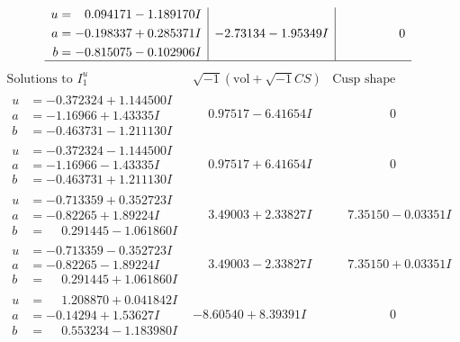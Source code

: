 \documentclass[1p]{elsarticle_modified}
\theoremstyle{definition}
\newcommand{\I}{\sqrt{-1}}
\begin{document}
$$\begin{array}{c|c|c}
\begin{aligned}
u &= \phantom{-}0.094171 - 1.189170 I \\
a &= -0.198337 + 0.285371 I \\
b &= -0.815075 - 0.102906 I\end{aligned}
 & -2.73134 - 1.95349 I & \phantom{-0.000000 } 0\\
 \hline 
 \end{array}$$\newpage$$\begin{array}{c|c|c}  
\text{Solutions to }I^u_{1}& \I (\text{vol} + \sqrt{-1}CS) & \text{Cusp shape}\\
 \hline 
\begin{aligned}
u &= -0.372324 + 1.144500 I \\
a &= -1.16966 + 1.43335 I \\
b &= -0.463731 - 1.211130 I\end{aligned}
 & \phantom{-}0.97517 - 6.41654 I & \phantom{-0.000000 } 0 \\ \hline\begin{aligned}
u &= -0.372324 - 1.144500 I \\
a &= -1.16966 - 1.43335 I \\
b &= -0.463731 + 1.211130 I\end{aligned}
 & \phantom{-}0.97517 + 6.41654 I & \phantom{-0.000000 } 0 \\ \hline\begin{aligned}
u &= -0.713359 + 0.352723 I \\
a &= -0.82265 + 1.89224 I \\
b &= \phantom{-}0.291445 - 1.061860 I\end{aligned}
 & \phantom{-}3.49003 + 2.33827 I & \phantom{-}7.35150 - 0.03351 I \\ \hline\begin{aligned}
u &= -0.713359 - 0.352723 I \\
a &= -0.82265 - 1.89224 I \\
b &= \phantom{-}0.291445 + 1.061860 I\end{aligned}
 & \phantom{-}3.49003 - 2.33827 I & \phantom{-}7.35150 + 0.03351 I \\ \hline\begin{aligned}
u &= \phantom{-}1.208870 + 0.041842 I \\
a &= -0.14294 + 1.53627 I \\
b &= \phantom{-}0.553234 - 1.183980 I\end{aligned}
 & -8.60540 + 8.39391 I & \phantom{-0.000000 } 0 \\ \hline\begin{aligned}

\end{aligned}
\end{array}$$
\end{document}

